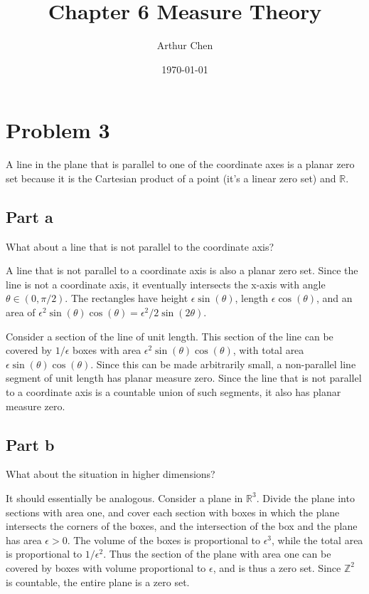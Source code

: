 \documentclass{article}
\author{Arthur Chen}
\title{Chapter 6 Measure Theory}
\date{\today}
\newcommand{\R}{\mathbb{R}}
\newcommand{\Z}{\mathbb{Z}}
\begin{document}
\maketitle

\section*{Problem 3}

A line in the plane that is parallel to one of the coordinate axes is a planar zero set because it is the Cartesian product of a point (it's a linear zero set) and $\R$.

\subsection*{Part a}

What about a line that is not parallel to the coordinate axis?

A line that is not parallel to a coordinate axis is also a planar zero set. Since the line is not a coordinate axis, it eventually intersects the x-axis with angle $\theta \in (0, \pi/2)$. The rectangles have height $\epsilon \sin(\theta)$, length $\epsilon \cos(\theta)$, and an area of $\epsilon^2 \sin(\theta) \cos(\theta) = \epsilon^2/2 \sin(2\theta)$.

Consider a section of the line of unit length. This section of the line can be covered by $1/\epsilon$ boxes with area $\epsilon^2 \sin(\theta) \cos(\theta)$, with total area $\epsilon \sin(\theta) \cos(\theta)$. Since this can be made arbitrarily small, a non-parallel line segment of unit length has planar measure zero. Since the line that is not parallel to a coordinate axis is a countable union of such segments, it also has planar measure zero.

\subsection*{Part b}

What about the situation in higher dimensions?

It should essentially be analogous. Consider a plane in $\R^3$.  Divide the plane into sections with area one, and cover each section with boxes in which the plane intersects the corners of the boxes, and the intersection of the box and the plane has area $\epsilon > 0$. The volume of the boxes is proportional to $\epsilon^3$, while the total area is proportional to $1/\epsilon^2$. Thus the section of the plane with area one can be covered by boxes with volume proportional to $\epsilon$, and is thus a zero set. Since $\Z^2$ is countable, the entire plane is a zero set.
\end{document}
